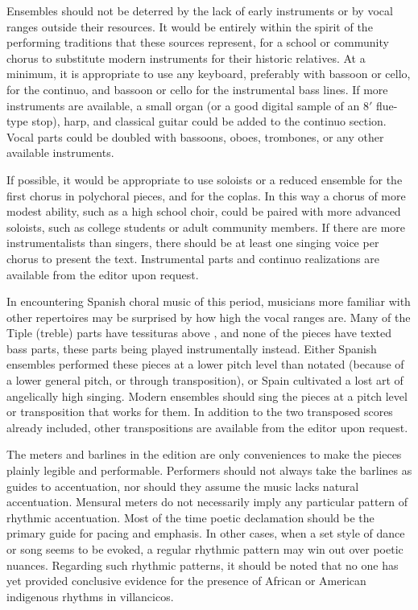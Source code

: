 Ensembles should not be deterred by the lack of early instruments or by vocal
ranges outside their resources.
It would be entirely within the spirit of the performing traditions that these
sources represent, for a school or community chorus to substitute modern
instruments for their historic relatives.
At a minimum, it is appropriate to use any keyboard, preferably with bassoon or
cello, for the continuo, and bassoon or cello for the instrumental bass lines.
If more instruments are available, a small organ (or a good digital sample of an 
8$'$ flue-type stop), harp, and classical guitar could be added to the continuo
section.  
Vocal parts could be doubled with bassoons, oboes, trombones, or any other
available instruments.

If possible, it would be appropriate to use soloists or a reduced ensemble for
the first chorus in polychoral pieces, and for the coplas.
In this way a chorus of more modest ability, such as a high school choir, could
be paired with more advanced soloists, such as college students or adult
community members.
If there are more instrumentalists than singers, there should be at least one
singing voice per chorus to present the text.
Instrumental parts and continuo realizations are available from the editor upon
request.

In encountering Spanish choral music of this period, musicians more familiar
with other repertoires may be surprised by how high the vocal ranges are.
Many of the Tiple (treble) parts have tessituras above , and none of
the pieces have texted bass parts, these parts being played instrumentally
instead.
Either Spanish ensembles performed these pieces at a lower pitch level than
notated (because of a lower general pitch, or through transposition), or Spain
cultivated a lost art of angelically high singing.%
\Autocite[157]{Kendrick:Jeremiah}
Modern ensembles should sing the pieces at a pitch level or transposition that
works for them.
In addition to the two transposed scores already included, other transpositions  
are available from the editor upon request.

The meters and barlines in the edition are only conveniences to make the pieces
plainly legible and performable.
Performers should not always take the barlines as guides to accentuation, nor
should they assume the music lacks natural accentuation.
Mensural meters do not necessarily imply any particular pattern of rhythmic 
accentuation.
Most of the time poetic declamation should be the primary guide for pacing
and emphasis.
In other cases, when a set style of dance or song seems to be evoked, a regular
rhythmic pattern may win out over poetic nuances.
Regarding such rhythmic patterns, it should be noted that no one has yet
provided conclusive evidence for the presence of African or American indigenous
rhythms in villancicos.

